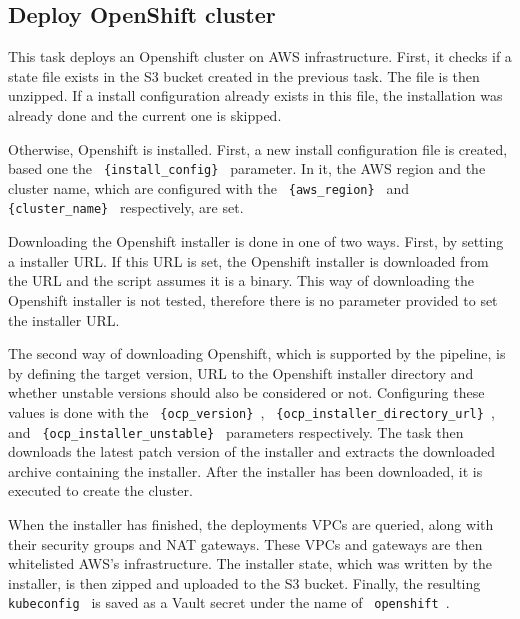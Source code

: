 \subsection{Deploy OpenShift cluster}\label{subsec:deploy-openshift-cluster}

This task deploys an Openshift cluster on AWS infrastructure.
First, it checks if a state file exists in the S3 bucket created in the previous task.
The file is then unzipped.
If a install configuration already exists in this file, the installation was already done and the current one is skipped.

Otherwise, Openshift is installed.
First, a new install configuration file is created, based one the \verb| {install_config} | parameter.
In it, the AWS region and the cluster name, which are configured with the \verb| {aws_region} | and \verb| {cluster_name} | respectively, are set.

Downloading the Openshift installer is done in one of two ways.
First, by setting a installer URL.
If this URL is set, the Openshift installer is downloaded from the URL and the script assumes it is a binary.
This way of downloading the Openshift installer is not tested, therefore there is no parameter provided to set the installer URL.

The second way of downloading Openshift, which is supported by the pipeline, is by defining the target version, URL to the Openshift installer directory and whether unstable versions should also be considered or not.
Configuring these values is done with the \verb| {ocp_version} |, \verb| {ocp_installer_directory_url} |, and \verb| {ocp_installer_unstable} | parameters respectively.
The task then downloads the latest patch version of the installer and extracts the downloaded archive containing the installer.
After the installer has been downloaded, it is executed to create the cluster.

When the installer has finished, the deployments VPCs are queried, along with their security groups and NAT gateways.
These VPCs and gateways are then whitelisted AWS's infrastructure.
The installer state, which was written by the installer, is then zipped and uploaded to the S3 bucket.
Finally, the resulting \verb| kubeconfig | is saved as a Vault secret under the name of \verb| openshift |.

